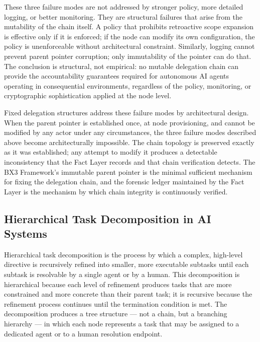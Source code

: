 These three failure modes are not addressed by stronger policy, more detailed logging, or better monitoring. They are structural failures that arise from the mutability of the chain itself. A policy that prohibits retroactive scope expansion is effective only if it is enforced; if the node can modify its own configuration, the policy is unenforceable without architectural constraint. Similarly, logging cannot prevent parent pointer corruption; only immutability of the pointer can do that. The conclusion is structural, not empirical: no mutable delegation chain can provide the accountability guarantees required for autonomous AI agents operating in consequential environments, regardless of the policy, monitoring, or cryptographic sophistication applied at the node level.\cite{bx3_framework_scope}

Fixed delegation structures address these failure modes by architectural design. When the parent pointer is established once, at node provisioning, and cannot be modified by any actor under any circumstances, the three failure modes described above become architecturally impossible. The chain topology is preserved exactly as it was established; any attempt to modify it produces a detectable inconsistency that the Fact Layer records and that chain verification detects. The BX3 Framework's immutable parent pointer is the minimal sufficient mechanism for fixing the delegation chain, and the forensic ledger maintained by the Fact Layer is the mechanism by which chain integrity is continuously verified.\cite{bx3_recursive_spawning_integration}

\subsection{Hierarchical Task Decomposition in AI Systems}
\label{sec:rs-task-decomposition}

Hierarchical task decomposition is the process by which a complex, high-level directive is recursively refined into smaller, more executable subtasks until each subtask is resolvable by a single agent or by a human. This decomposition is hierarchical because each level of refinement produces tasks that are more constrained and more concrete than their parent task; it is recursive because the refinement process continues until the termination condition is met. The decomposition produces a tree structure — not a chain, but a branching hierarchy — in which each node represents a task that may be assigned to a dedicated agent or to a human resolution endpoint.\cite{zylos_hierarchical_coordination}

